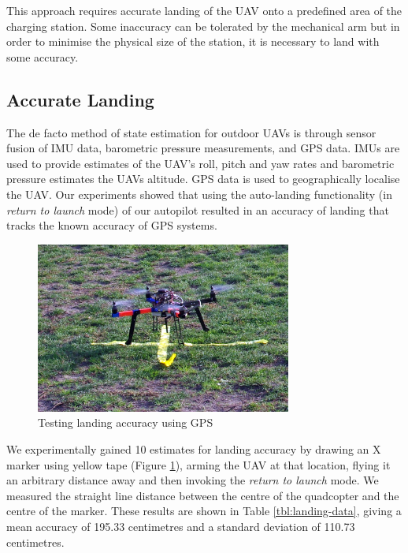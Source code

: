 \documentclass[10pt]{scrartcl} %
\begin{document}
This approach requires accurate landing of the UAV onto a predefined area of the charging station. Some inaccuracy can be tolerated by the mechanical arm but in order to minimise the physical size of the station, it is necessary to land with some accuracy. 


\subsection{Accurate Landing}
The de facto method of state estimation for outdoor UAVs is through sensor fusion of IMU data, barometric pressure measurements, and GPS data. IMUs are used to provide estimates of the UAV's roll, pitch and yaw rates and barometric pressure estimates the UAVs altitude. GPS data is used to geographically localise the UAV. Our experiments showed that using the auto-landing functionality (in \textit{return to launch} mode) of our autopilot resulted in an accuracy of landing that tracks the known accuracy of GPS systems. 

\begin{figure}[h]
    \centering
    \includegraphics[width=0.75\textwidth]{images/marker.JPG}
    \caption{Testing landing accuracy using GPS}
    \label{fig:marker}
\end{figure}

We experimentally gained 10 estimates for landing accuracy by drawing an X marker using yellow tape (Figure \ref{fig:marker}), arming the UAV at that location, flying it an arbitrary distance away and then invoking the \textit{return to launch} mode. We measured the straight line distance between the centre of the quadcopter and the centre of the marker. These results are shown in Table \ref{tbl:landing-data}, giving a mean accuracy of 195.33 centimetres and a standard deviation of 110.73 centimetres. 
\end{document}
